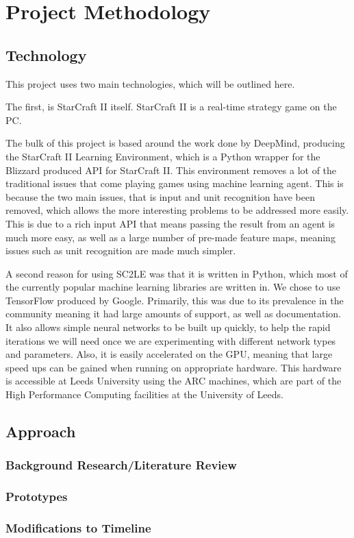 \chapter{Project Methodology}%
\label{method}

\section{Technology}

This project uses two main technologies, which will be outlined here.

The first, is StarCraft II itself. StarCraft II is a real-time strategy game on
the PC\@. %

The bulk of this project is based around the work done by DeepMind, producing
the StarCraft II Learning Environment, which is a Python\cite{python-website}
wrapper for the Blizzard produced API for StarCraft II\cite{bliz-api}. This
environment removes a lot of the traditional issues that come playing
games using machine learning agent. This is because the two main issues, that
is input and unit recognition have been removed, which allows the more interesting
problems to be addressed more easily. This is due to a rich input API that means
passing the result from an agent is much more easy, as well as a large number
of pre-made feature maps, meaning issues such as unit recognition are made much
simpler.


A second reason for using SC2LE was that it is written in Python, which most
of the currently popular machine learning libraries are written in. We chose to
use TensorFlow\cite{tensorflow2015-whitepaper} produced by Google. Primarily,
this was due to its prevalence in the community meaning it had large amounts of
support, as well as documentation. It also allows simple neural networks to be
built up quickly, to help the rapid iterations we will need once we are experimenting
with different network types and parameters. Also, it is easily accelerated on the
GPU, meaning that large speed ups can be gained when running on appropriate hardware.
This hardware is accessible at Leeds University using the ARC machines, which are
part of the High Performance Computing facilities at the University
of Leeds\cite{arc}.

\section{Approach}

\subsection{Background Research/Literature Review}

\subsection{Prototypes}

\subsection{Modifications to Timeline}
